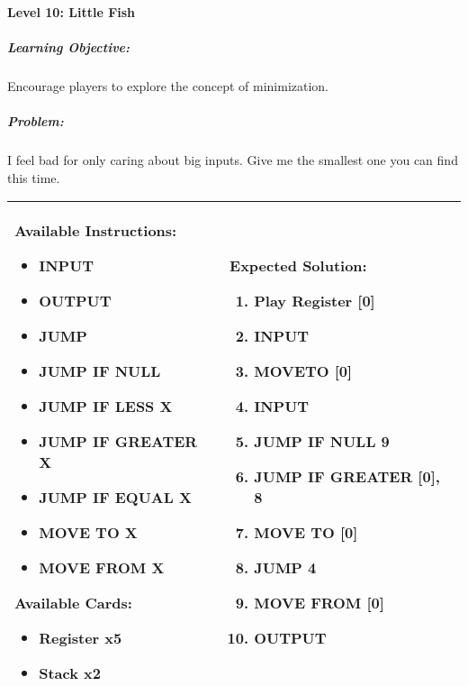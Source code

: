 \paragraph{Level 10: Little Fish}
\subparagraph{Learning Objective:} Encourage players to explore the concept of minimization.

\subparagraph{Problem:} I feel bad for only caring about big inputs. Give me the smallest one you can find this time.

\begin{center}
    \begin{tabular}{ | m{5cm} | m{9cm} | } 
        \hline
            \textbf{Available Instructions:} 
            \begin{itemize}
                \setlength\itemsep{-.35em}
                \item INPUT
                \item OUTPUT
                \item JUMP
                \item JUMP IF NULL
                \item JUMP IF LESS X
                \item JUMP IF GREATER X
		\item JUMP IF EQUAL X
                \item MOVE TO X
                \item MOVE FROM X
            \end{itemize}
            \textbf{Available Cards:} 
            \begin{itemize}
                \setlength\itemsep{-.35em}
                \item Register x5
                \item Stack x2
            \end{itemize}& 
            \textbf{Expected Solution:} 
            \begin{enumerate}
                \setlength\itemsep{-.35em}
                \item Play Register [0]
                \item INPUT
                \item MOVETO [0]
                \item INPUT
                \item JUMP IF NULL 9
                \item JUMP IF GREATER [0], 8
                \item MOVE TO [0]
                \item JUMP 4
                \item MOVE FROM [0]
                \item OUTPUT
            \end{enumerate}
            \\
        \hline
    \end{tabular}
\end{center}


